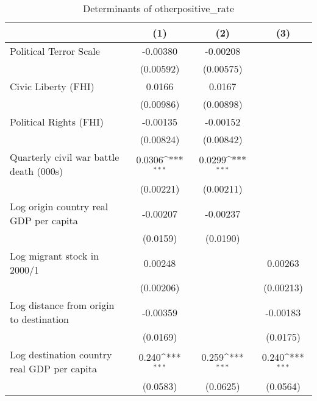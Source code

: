 \begin{table}[htbp]\centering
\def\sym#1{\ifmmode^{#1}\else\(^{#1}\)\fi}
\caption{Determinants of otherpositive\_rate}
\begin{tabular}{l*{3}{c}}
\hline\hline
                    &\multicolumn{1}{c}{(1)}         &\multicolumn{1}{c}{(2)}         &\multicolumn{1}{c}{(3)}         \\
\hline
Political Terror Scale&    -0.00380         &    -0.00208         &                     \\
                    &   (0.00592)         &   (0.00575)         &                     \\
[1em]
Civic Liberty (FHI) &      0.0166         &      0.0167         &                     \\
                    &   (0.00986)         &   (0.00898)         &                     \\
[1em]
Political Rights (FHI)&    -0.00135         &    -0.00152         &                     \\
                    &   (0.00824)         &   (0.00842)         &                     \\
[1em]
Quarterly civil war battle death (000s)&      0.0306\sym{***}&      0.0299\sym{***}&                     \\
                    &   (0.00221)         &   (0.00211)         &                     \\
[1em]
Log origin country real GDP per capita&    -0.00207         &    -0.00237         &                     \\
                    &    (0.0159)         &    (0.0190)         &                     \\
[1em]
Log migrant stock in 2000/1&     0.00248         &                     &     0.00263         \\
                    &   (0.00206)         &                     &   (0.00213)         \\
[1em]
Log distance from origin to destination&    -0.00359         &                     &    -0.00183         \\
                    &    (0.0169)         &                     &    (0.0175)         \\
[1em]
Log destination country real GDP per capita&       0.240\sym{***}&       0.259\sym{***}&       0.240\sym{***}\\
                    &    (0.0583)         &    (0.0625)         &    (0.0564)         \\

\end{tabular}
\end{table}

